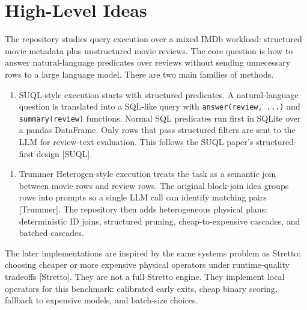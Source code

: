\documentclass[11pt,oneside]{book}
\begin{document}
\chapter{High-Level Ideas}
The repository studies query execution over a mixed IMDb workload: structured movie metadata plus unstructured movie reviews. The core question is how to answer natural-language predicates over reviews without sending unnecessary rows to a large language model.
There are two main families of methods.
\begin{enumerate}
\item SUQL-style execution starts with structured predicates. A natural-language
question is translated into a SQL-like query with \texttt{answer(review, ...)} and \texttt{summary(review)} functions. Normal SQL predicates run first in SQLite over a pandas DataFrame. Only rows that pass structured filters are sent to the LLM for review-text evaluation. This follows the SUQL paper's structured-first design [SUQL].
\end{enumerate}
\begin{enumerate}
\item Trummer Heterogen-style execution treats the task as a semantic join between
movie rows and review rows. The original block-join idea groups rows into prompts so a single LLM call can identify matching pairs [Trummer]. The repository then adds heterogeneous physical plans: deterministic ID joins, structured pruning, cheap-to-expensive cascades, and batched cascades.
\end{enumerate}
The later implementations are inspired by the same systems problem as Stretto: choosing cheaper or more expensive physical operators under runtime-quality tradeoffs [Stretto]. They are not a full Stretto engine. They implement local operators for this benchmark: calibrated early exits, cheap binary scoring, fallback to expensive models, and batch-size choices.
\end{document}
